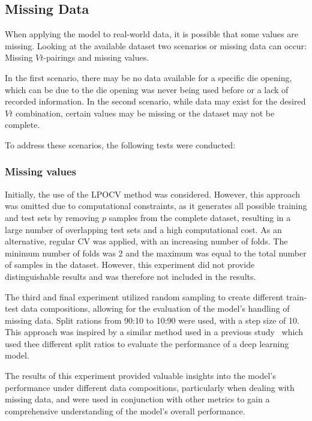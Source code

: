 \subsection{Missing Data}\label{subsec:missing-data}
When applying the model to real-world data, it is possible that some values are missing.
Looking at the available dataset two scenarios or missing data can occur:
Missing $Vt$-pairings and missing values.

In the first scenario, there may be no data available for a specific die opening, which can be due to the die opening
was never being used before or a lack of recorded information.
In the second scenario, while data may exist for the desired $Vt$ combination, certain values may
be missing or the dataset may not be complete.

To address these scenarios, the following tests were conducted:

\subsubsection{Missing values}

Initially, the use of the \ac{LPOCV} method was considered.
However, this approach was omitted due to computational constraints, as it generates all possible
training and test sets by removing $p$ samples from the complete dataset, resulting in a large
number of overlapping test sets and a high computational cost.
As an alternative, regular \ac{CV} was applied, with an increasing number of folds.
The minimum number of folds was 2 and the maximum was equal to the total number of samples in the
dataset.
However, this experiment did not provide distinguishable results and was therefore not
included in the results.

The third and final experiment utilized random sampling to create different train- test data compositions, allowing
for the evaluation of the model's handling of missing data.
Split rations from 90:10 to 10:90 were used, with a step size of 10.
This approach was inspired by a similar method used in a previous study~\cite[p. 570--574]{liu2021deep}  which used
thee different split ratios to evaluate the performance of a deep learning model.

The results of this experiment provided valuable insights into the model's performance under
different data compositions, particularly when dealing with missing
data, and were used in conjunction with other metrics to gain a comprehensive understanding of
the model's overall performance.

